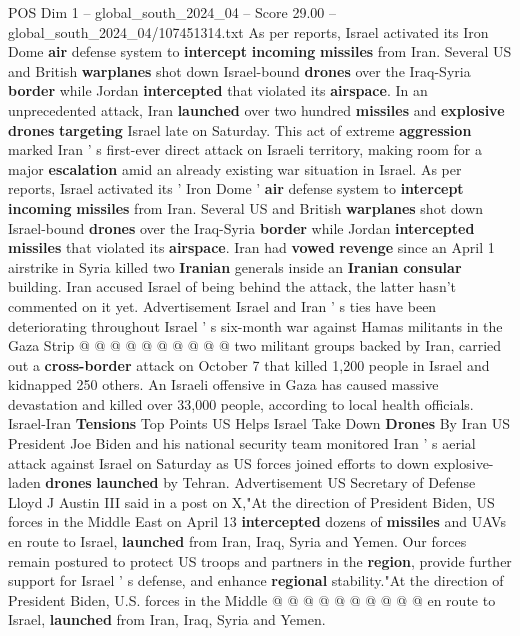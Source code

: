\begin{textsample}{POS Dim 1 – global\_south\_2024\_04 – Score 29.00 – global\_south\_2024\_04/107451314.txt}  \label{ex:f1_pos_043}
As per reports, Israel activated its Iron Dome \textbf{air} defense system to \textbf{intercept} \textbf{incoming} \textbf{missiles} from Iran.
Several US and British \textbf{warplanes} shot down Israel-bound \textbf{drones} over the Iraq-Syria \textbf{border} while Jordan \textbf{intercepted} that violated its \textbf{airspace}.
In an unprecedented attack, Iran \textbf{launched} over two hundred \textbf{missiles} and \textbf{explosive} \textbf{drones} \textbf{targeting} Israel late on Saturday.
This act of extreme \textbf{aggression} marked Iran ' s first-ever direct attack on Israeli territory, making room for a major \textbf{escalation} amid an already existing war situation in Israel.
As per reports, Israel activated its ' Iron Dome ' \textbf{air} defense system to \textbf{intercept} \textbf{incoming} \textbf{missiles} from Iran.
Several US and British \textbf{warplanes} shot down Israel-bound \textbf{drones} over the Iraq-Syria \textbf{border} while Jordan \textbf{intercepted} \textbf{missiles} that violated its \textbf{airspace}.
Iran had \textbf{vowed} \textbf{revenge} since an April 1 airstrike in Syria killed two \textbf{Iranian} generals inside an \textbf{Iranian} \textbf{consular} building.
Iran accused Israel of being behind the attack, the latter hasn't commented on it yet.
Advertisement Israel and Iran ' s ties have been deteriorating throughout Israel ' s six-month war against Hamas militants in the Gaza Strip @ @ @ @ @ @ @ @ @ @ two militant groups backed by Iran, carried out a \textbf{cross-border} attack on October 7 that killed 1,200 people in Israel and kidnapped 250 others.
An Israeli offensive in Gaza has caused massive devastation and killed over 33,000 people, according to local health officials.
Israel-Iran \textbf{Tensions} Top Points US Helps Israel Take Down \textbf{Drones} By Iran US President Joe Biden and his national security team monitored Iran ' s aerial attack against Israel on Saturday as US forces joined efforts to down explosive-laden \textbf{drones} \textbf{launched} by Tehran.
Advertisement US Secretary of Defense Lloyd J Austin III said in a post on X,"At the direction of President Biden, US forces in the Middle East on April 13 \textbf{intercepted} dozens of \textbf{missiles} and UAVs en route to Israel, \textbf{launched} from Iran, Iraq, Syria and Yemen.
Our forces remain postured to protect US troops and partners in the \textbf{region}, provide further support for Israel ' s defense, and enhance \textbf{regional} stability."At the direction of President Biden, U.S. forces in the Middle @ @ @ @ @ @ @ @ @ @ en route to Israel, \textbf{launched} from Iran, Iraq, Syria and Yemen.

\end{textsample}
